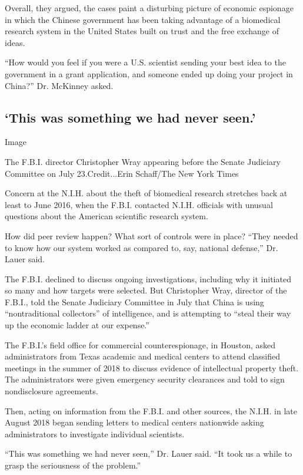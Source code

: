 Overall, they argued, the cases paint a disturbing picture of economic
espionage in which the Chinese government has been taking advantage of a
biomedical research system in the United States built on trust and the
free exchange of ideas.

``How would you feel if you were a U.S. scientist sending your best idea
to the government in a grant application, and someone ended up doing
your project in China?'' Dr. McKinney asked.

\hypertarget{this-was-something-we-had-never-seen}{%
\subsection{`This was something we had never
seen.'}\label{this-was-something-we-had-never-seen}}

Image

The F.B.I. director Christopher Wray appearing before the Senate
Judiciary Committee on July 23.Credit...Erin Schaff/The New York Times

Concern at the N.I.H. about the theft of biomedical research stretches
back at least to June 2016, when the F.B.I. contacted N.I.H. officials
with unusual questions about the American scientific research system.

How did peer review happen? What sort of controls were in place? ``They
needed to know how our system worked as compared to, say, national
defense,'' Dr. Lauer said.

The F.B.I. declined to discuss ongoing investigations, including why it
initiated so many and how targets were selected. But Christopher Wray,
director of the F.B.I., told the Senate Judiciary Committee in July that
China is using ``nontraditional collectors'' of intelligence, and is
attempting to ``steal their way up the economic ladder at our expense.''

The F.B.I.'s field office for commercial counterespionage, in Houston,
asked administrators from Texas academic and medical centers to attend
classified meetings in the summer of 2018 to discuss evidence of
intellectual property theft. The administrators were given emergency
security clearances and told to sign nondisclosure agreements.

Then, acting on information from the F.B.I. and other sources, the
N.I.H. in late August 2018 began sending letters to medical centers
nationwide asking administrators to investigate individual scientists.

``This was something we had never seen,'' Dr. Lauer said. ``It took us a
while to grasp the seriousness of the problem.''


